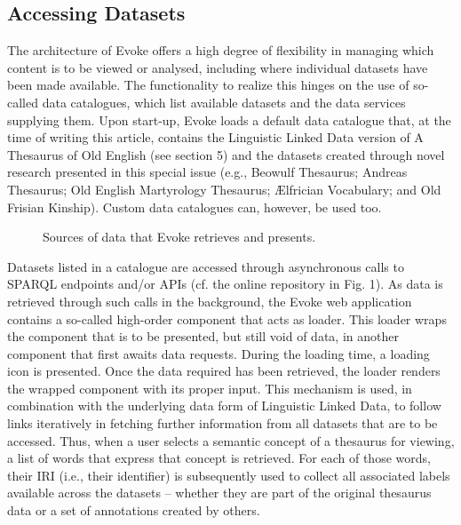 \subsection{Accessing Datasets}
The architecture of Evoke offers a high degree of flexibility in managing which content is to be viewed or analysed, including where individual datasets have been made available. The functionality to realize this hinges on the use of so-called data catalogues, which list available datasets and the data services supplying them. Upon start-up, Evoke loads a default data catalogue that, at the time of writing this article, contains the Linguistic Linked Data version of A Thesaurus of Old English (see section 5) and the datasets created through novel research presented in this special issue (e.g., Beowulf Thesaurus; Andreas Thesaurus; Old English Martyrology Thesaurus; Ælfrician Vocabulary; and Old Frisian Kinship). Custom data catalogues can, however, be used too.

\begin{figure}[htbp]
	\caption[]{\label{fig:Stolk2021a:Fig1} Sources of data that Evoke retrieves and presents.}
\end{figure}

Datasets listed in a catalogue are accessed through asynchronous calls to SPARQL endpoints and/or APIs (cf. the online repository in Fig. 1). As data is retrieved through such calls in the background, the Evoke web application contains a so-called high-order component that acts as loader. This loader wraps the component that is to be presented, but still void of data, in another component that first awaits data requests. During the loading time, a loading icon is presented. Once the data required has been retrieved, the loader renders the wrapped component with its proper input. This mechanism is used, in combination with the underlying data form of Linguistic Linked Data, to follow links iteratively in fetching further information from all datasets that are to be accessed. Thus, when a user selects a semantic concept of a thesaurus for viewing, a list of words that express that concept is retrieved. For each of those words, their IRI (i.e., their identifier) is subsequently used to collect all associated labels available across the datasets – whether they are part of the original thesaurus data or a set of annotations created by others.

